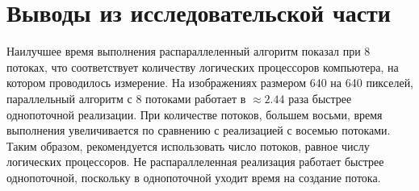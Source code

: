 \section{Выводы из исследовательской части}

Наилучшее время выполнения распараллеленный алгоритм показал при 8 потоках, что соответствует количеству логических процессоров компьютера, на котором проводилось измерение. На изображениях размером 640 на 640 пикселей, параллельный алгоритм с 8 потоками работает в $\approx 2.44$ раза быстрее однопоточной реализации. При количестве потоков, большем восьми, время
выполнения увеличивается по сравнению с реализацией с восемью потоками. Таким образом, рекомендуется использовать число потоков, равное числу логических процессоров.
Не распараллеленная реализация работает быстрее однопоточной, поскольку в
однопоточной уходит время на создание потока.